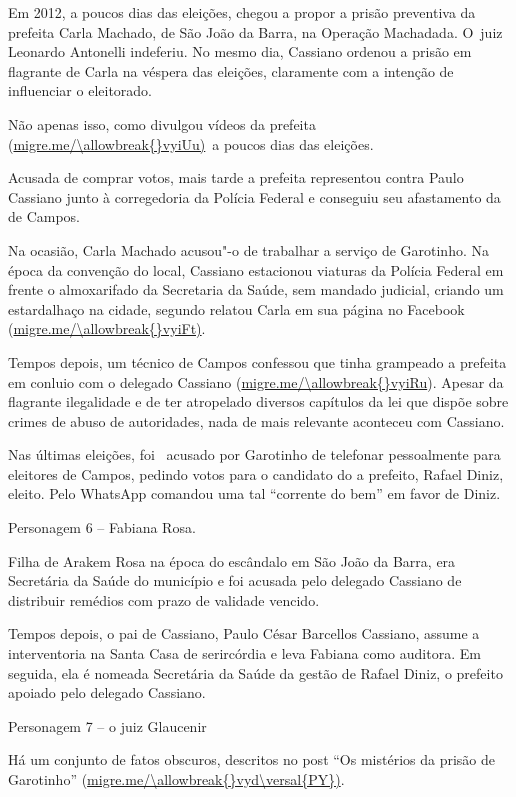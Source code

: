 Em 2012, a poucos dias das eleições, chegou a propor a prisão preventiva
da prefeita Carla Machado, de São João da Barra, na Operação Machadada.
O~juiz Leonardo Antonelli indeferiu. No mesmo dia, Cassiano ordenou a
prisão em flagrante de Carla na véspera das eleições, claramente com a
intenção de influenciar o eleitorado.

Não apenas isso, como divulgou vídeos da prefeita
(\url{migre.me/\allowbreak{}vyiUu)}~a poucos dias das eleições.

Acusada de comprar votos, mais tarde a prefeita representou contra Paulo
Cassiano junto à corregedoria da Polícia Federal e conseguiu seu
afastamento da  de Campos.

Na ocasião, Carla Machado acusou"-o de trabalhar a serviço de Garotinho.
Na época da convenção do  local, Cassiano estacionou viaturas da
Polícia Federal em frente o almoxarifado da Secretaria da Saúde, sem
mandado judicial, criando um estardalhaço na cidade, segundo relatou
Carla em sua página no Facebook (\url{migre.me/\allowbreak{}vyiFt)}.

Tempos depois, um técnico de Campos confessou que tinha grampeado a
prefeita em conluio com o delegado Cassiano
(\url{migre.me/\allowbreak{}vyiRu}). Apesar da flagrante ilegalidade e de ter
atropelado diversos capítulos da lei que dispõe sobre crimes de abuso de
autoridades, nada de mais relevante aconteceu com Cassiano.

Nas últimas eleições, foi ~acusado por Garotinho de telefonar
pessoalmente para eleitores de Campos, pedindo votos para o candidato do
 a prefeito, Rafael Diniz, eleito. Pelo WhatsApp comandou uma tal
``corrente do bem'' em favor de Diniz.

Personagem 6 -- Fabiana Rosa.

Filha de Arakem Rosa na época do escândalo em São João da Barra, era
Secretária da Saúde do município e foi acusada pelo delegado Cassiano
 de distribuir remédios com prazo de validade vencido.

Tempos depois, o pai de Cassiano, Paulo César Barcellos Cassiano, assume
a interventoria na Santa Casa de serircórdia e leva Fabiana como
auditora. Em seguida, ela é nomeada Secretária da Saúde da gestão de
Rafael Diniz, o prefeito apoiado pelo delegado Cassiano.

Personagem 7 -- o juiz Glaucenir

Há um conjunto de fatos obscuros, descritos no post ``Os mistérios da
prisão de Garotinho'' (\url{migre.me/\allowbreak{}vyd\versal{PY})}.

